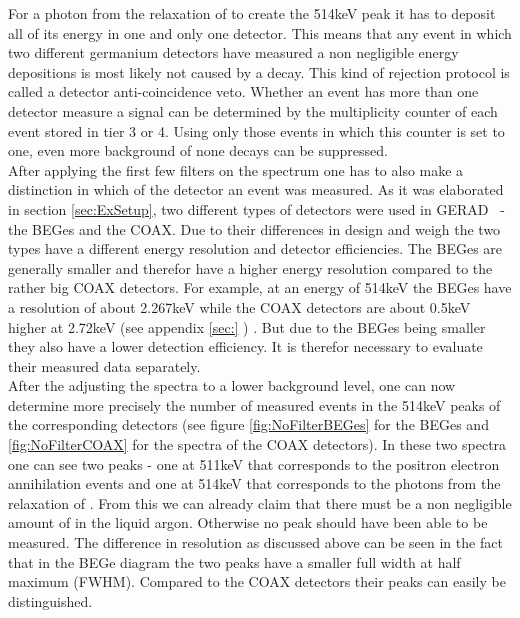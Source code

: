 \documentclass[encoding=utf8,british]{tumphthesis}
\begin{document}
For a photon from the relaxation of  to create the 514keV peak it has to deposit all of its energy in one and only one detector. 
This means that any event in which two different germanium detectors have measured a non negligible energy depositions is most likely not caused by a \Kr decay.
This kind of rejection protocol is called a detector anti-coincidence veto.
Whether an event has more than one detector measure a signal can be determined by the multiplicity counter of each event stored in tier 3 or 4.
Using only those events in which this counter is set to one, even more background of none \Kr decays can be suppressed.
\\

After applying the first few filters on the spectrum one has to also make a distinction in which of the detector an event was measured.
As it was elaborated in section \ref{sec:ExSetup}, two different types of detectors were used in GERAD \PII\ - the BEGes  and the COAX. 
Due to their differences in design and weigh the two types have a different energy resolution and detector efficiencies. 
The BEGes are generally smaller and therefor have a higher energy resolution compared to the rather big COAX detectors.
For example, at an energy of 514keV the BEGes have a resolution of about 2.267keV while the COAX detectors are about 0.5keV higher at 2.72keV (see appendix \ref{sec:} ) \cite{agostini_background_2017}. 
But due to the BEGes being smaller they also have a lower detection efficiency.
It is therefor necessary to evaluate their measured data separately.
\\

After the adjusting the spectra to a lower background level, one can now determine more precisely the number of measured events in the 514keV peaks of the corresponding detectors (see figure \ref{fig:NoFilterBEGes} for the BEGes and \ref{fig:NoFilterCOAX} for the spectra of the COAX detectors). 
In these two spectra one can see two peaks - one at 511keV that corresponds to the positron electron annihilation events and one at 514keV that corresponds to the photons from the relaxation of .
From this we can already claim that there must be a non negligible amount of \Kr in the liquid argon.
Otherwise no peak should have been able to be measured. 
The difference in resolution as discussed above can be seen in the fact that in the BEGe diagram the two peaks have a smaller full width at half maximum (FWHM).
Compared to the COAX detectors their peaks can easily be distinguished.  
\\
\end{document}
